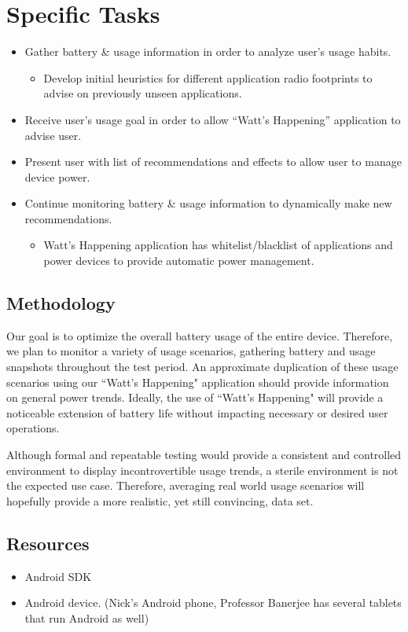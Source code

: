 \documentclass{article}
\begin{document}
\section*{Specific Tasks}
\begin{itemize}
\item Gather battery \& usage information in order to analyze user's usage habits.
	\begin{itemize}
	\item Develop initial heuristics for different application radio footprints to advise on previously unseen applications.
	\end{itemize}
\item Receive user's usage goal in order to allow ``Watt's Happening'' application to advise user.
\item Present user with list of recommendations and effects to allow user to manage device power.
\item Continue monitoring battery \& usage information to dynamically make new recommendations.
	\begin{itemize}
	\item Watt's Happening application has whitelist/blacklist of applications and power devices to provide automatic power management.
	\end{itemize}
\end{itemize}

\subsection*{Methodology}
Our goal is to optimize the overall battery usage of the entire device. 
Therefore, we plan to monitor a variety of usage scenarios, gathering battery and usage snapshots throughout the test period. 
An approximate duplication of these usage scenarios using our ``Watt's Happening" application should provide information on general power trends. 
Ideally, the use of ``Watt's Happening" will provide a noticeable extension of battery life without impacting necessary or desired user operations.

Although formal and repeatable testing would provide a consistent and controlled environment to display incontrovertible usage trends, a sterile environment is not the expected use case.
Therefore, averaging real world usage scenarios will hopefully provide a more realistic, yet still convincing, data set.

\subsection*{Resources}
\begin{itemize}
\item Android SDK
\item Android device. (Nick's Android phone, Professor Banerjee has several tablets that run Android as well)
\end{itemize}
\end{document}
